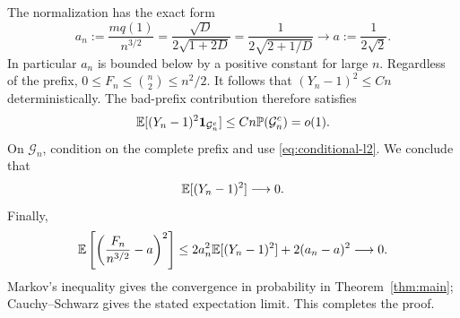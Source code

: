 The normalization has the exact form
\begin{equation}\label{eq:constant}
 a_n:=\frac{mq(1)}{n^{3/2}}
     =\frac{\sqrt D}{2\sqrt{1+2D}}
     =\frac1{2\sqrt{2+1/D}}
     \longrightarrow a:=\frac1{2\sqrt2}.
\end{equation}
In particular $a_n$ is bounded below by a positive constant for large
$n$. Regardless of the prefix, $0\le F_n\le\binom n2\le n^2/2$.
It follows that $(Y_n-1)^2\le Cn$ deterministically. The bad-prefix
contribution therefore satisfies
\[
 \mathbb E[(Y_n-1)^2\mathbf1_{\mathcal G_n^c}]
      \le Cn\mathbb P(\mathcal G_n^c)=o(1).
\]
On $\mathcal G_n$, condition on the complete prefix and use
\eqref{eq:conditional-l2}. We conclude that
\[
 \mathbb E[(Y_n-1)^2]\longrightarrow0.
\]
Finally,
\[
 \mathbb E\left[\left(\frac{F_n}{n^{3/2}}-a\right)^2\right]
 \le2a_n^2\mathbb E[(Y_n-1)^2]+2(a_n-a)^2\longrightarrow0.
\]
Markov's inequality gives the convergence in probability in
Theorem~\ref{thm:main}; Cauchy--Schwarz gives the stated expectation
limit. This completes the proof.
